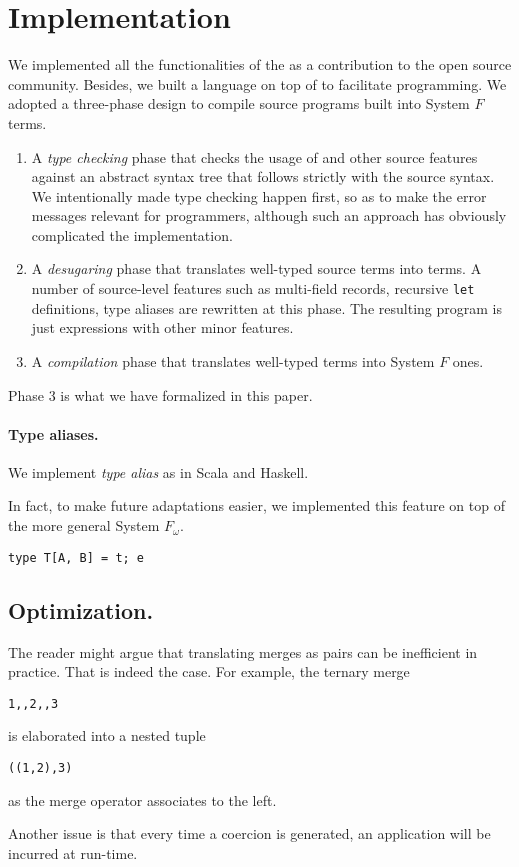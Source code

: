 \section{Implementation}

We implemented all the functionalities of the \name as a contribution to the
open source community. Besides, we built a language on top of \name to
facilitate programming. We adopted a three-phase design to compile source
programs built into System $ F $ terms.

\begin{enumerate}
\item A \emph{type checking} phase that checks the usage of \name and other
  source features against an abstract syntax tree that follows strictly with the
  source syntax. We intentionally made type checking happen first, so as to make
  the error messages relevant for programmers, although such an approach has
  obviously complicated the implementation.

\item A \emph{desugaring} phase that translates well-typed source terms into
  \name terms. A number of source-level features such as multi-field records,
  recursive \texttt{let} definitions, type aliases are rewritten at this phase.
  The resulting program is just \name expressions with other minor features.

\item A \emph{compilation} phase that translates well-typed \name terms
  into System $ F $ ones.
\end{enumerate}

Phase 3 is what we have formalized in this paper.

\paragraph{Type aliases.}

We implement \emph{type alias} as in Scala and Haskell.

In fact, to make future adaptations easier, we implemented this feature on top
of the more general System $ F_{\omega} $.


\begin{lstlisting}
type T[A, B] = t; e
\end{lstlisting}

\subsection{Optimization.}

The reader might argue that translating merges as pairs can be inefficient in
practice. That is indeed the case. For example, the ternary merge
\begin{lstlisting}
1,,2,,3 
\end{lstlisting}
is elaborated into a nested tuple
\begin{lstlisting}
((1,2),3)
\end{lstlisting}
as the merge operator associates to the left.

Another issue is that every time a coercion is generated, an application will be
incurred at run-time.
